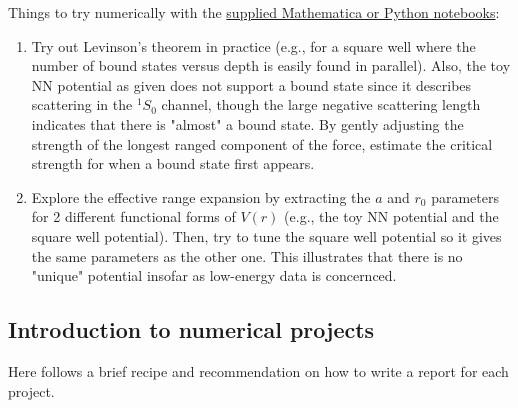 \documentclass[%
oneside,                 %
final,                   %
10pt]{article}
\begin{document}
Things to try numerically with the \href{{https://github.com/ManyBodyPhysics/NuclearForces/tree/master/doc/Projects/2017/Project1}}{supplied Mathematica or Python notebooks}:
\begin{enumerate}
 \item Try out Levinson's theorem in practice (e.g., for a square well where the number of bound states versus depth is easily found in parallel). Also, the toy NN potential as given does not support a bound state since it describes scattering in the $^1S_0$ channel, though the large negative scattering length indicates that there is "almost" a bound state. By gently adjusting the strength of the longest ranged component of the force, estimate the critical strength for when a bound state first appears. 

 \item Explore the effective range expansion by extracting the $a$ and $r_0$ parameters for 2 different functional forms of $V(r)$ (e.g., the toy NN potential and the square well potential). Then, try to tune the square well potential so it gives the same parameters as the other one. This illustrates that there is no "unique" potential insofar as low-energy data is concernced.
\end{enumerate}

\noindent
\subsection*{Introduction to numerical projects}

Here follows a brief recipe and recommendation on how to write a report for each
project.
\end{document}
